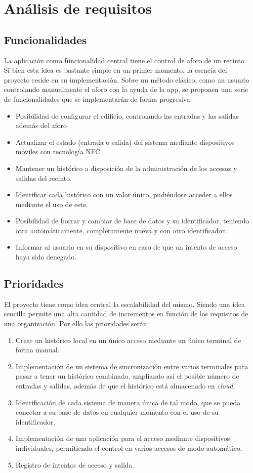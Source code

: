 \documentclass[a4paper,openright,12pt]{article}
\begin{document}
\section{Análisis de requisitos}
\subsection{Funcionalidades}
La aplicación como funcionalidad central tiene el control de aforo de un recinto. Si bien esta idea es bastante simple en un primer momento, la esencia del proyecto reside en su implementación. Sobre un método clásico, como un usuario controlando manualmente el aforo con la ayuda de la app, se proponen una serie de funcionalidades que se implementarán de forma progresiva:
\begin{itemize}
    \item Posibilidad de configurar el edificio, controlando las entradas y las salidas además del aforo
    \item Actualizar el estado (entrada o salida) del sistema mediante dispositivos móviles con tecnología NFC.
    \item Mantener un histórico a disposición de la administración de los accesos y salidas del recinto.
    \item Identificar cada histórico con un valor único, pudiéndose acceder a ellos mediante el uso de este.
    \item Posibilidad de borrar y cambiar de base de datos y su identificador, teniendo otra automáticamente, completamente nueva y con otro identificador.
    \item Informar al usuario en su dispositivo en caso de que un intento de acceso haya sido denegado.
\end{itemize}

\subsection{Prioridades}
El proyecto tiene como idea central la escalabilidad del mismo. Siendo una idea sencilla permite una alta cantidad de incrementos en función de los requisitos de una organización. Por ello las prioridades serán:
\begin{enumerate}
  \item Crear un histórico local en un único acceso mediante un único terminal de forma manual.
  \item Implementación de un sistema de sincronización entre varios terminales para pasar a tener un histórico combinado, ampliando así el posible número de entradas y salidas, además de que el histórico está almacenado en \textit{cloud}.
  \item Identificación de cada sistema de manera única de tal modo, que se pueda conectar a su base de datos en cualquier momento con el uso de su identificador.
  \item Implementación de una aplicación para el acceso mediante dispositivos individuales, permitiendo el control en varios accesos de modo automático.
  \item Registro de intentos de acceso y salida.
\end{enumerate}
\end{document}

